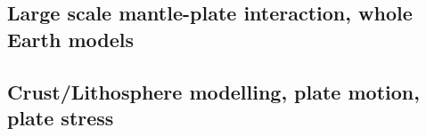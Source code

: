 \subsection{Large scale mantle-plate interaction, whole Earth models}

\cite{yufl85}
\cite{loja95}
\cite{coli06}
\cite{wamg10}\cite{golw00}\cite{stgb10}\cite{cobe10}
\cite{algs12}\cite{roct12}\cite{crtm12}
\cite{ghbh13}\cite{yahb13}
\cite{macs16}
\cite{hulz18}\cite{osss18b}

\subsection{Crust/Lithosphere modelling, plate motion, plate stress}

